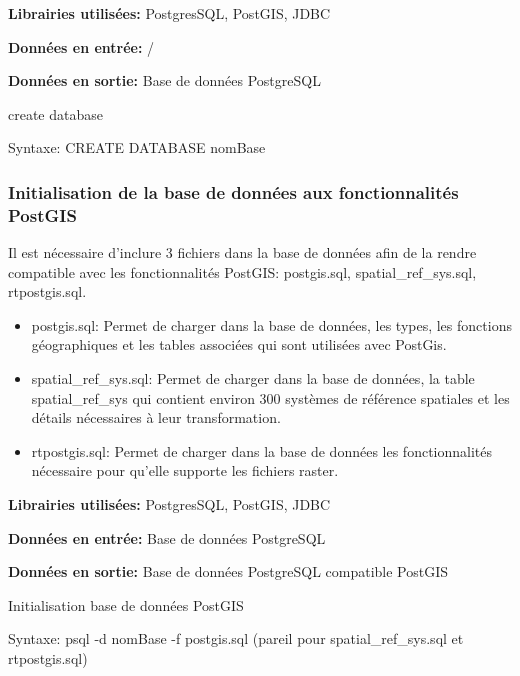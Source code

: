\textbf{Librairies utilisées:} PostgresSQL, PostGIS, JDBC 

\textbf{Données en entrée:}  /

\textbf{Données en sortie:} Base de données PostgreSQL \\

\begin{algorithm}[H]
\caption{\label{traitement3} create database}
Syntaxe:
CREATE DATABASE nomBase\\
\end{algorithm}

\subsubsection{Initialisation de la base de données aux fonctionnalités PostGIS}

Il est nécessaire d'inclure 3 fichiers dans la base de données afin de la rendre compatible avec les fonctionnalités PostGIS: postgis.sql, spatial\_ref\_sys.sql, rtpostgis.sql.\\

\begin{itemize}
\item postgis.sql: Permet de charger dans la base de données, les types, les fonctions géographiques et les tables associées qui sont utilisées avec PostGis.
\item spatial\_ref\_sys.sql: Permet de charger dans la base de données, la table spatial\_ref\_sys qui contient environ 300 systèmes de référence spatiales et les détails nécessaires à leur transformation.
\item rtpostgis.sql: Permet de charger dans la base de données les fonctionnalités nécessaire pour qu'elle supporte les fichiers raster.\\
\end{itemize}

\textbf{Librairies utilisées:} PostgresSQL, PostGIS, JDBC 

\textbf{Données en entrée:} Base de données PostgreSQL

\textbf{Données en sortie:} Base de données PostgreSQL compatible PostGIS \\

\begin{algorithm}[H]
\caption{\label{traitement4} Initialisation base de données PostGIS}
Syntaxe:
psql -d nomBase -f postgis.sql (pareil pour spatial\_ref\_sys.sql et rtpostgis.sql)\\
\end{algorithm}

